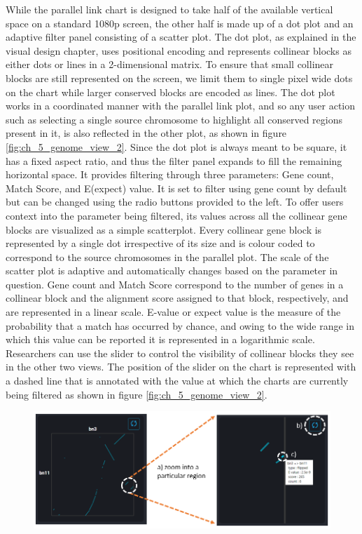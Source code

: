 While the parallel link chart is designed to take half of the available vertical space on a standard 1080p screen, the other half is made up of a dot plot and an adaptive filter panel consisting of a scatter plot. The dot plot, as explained in the visual design chapter, uses positional encoding and represents collinear blocks as either dots or lines in a 2-dimensional matrix. To ensure that small collinear blocks are still represented on the screen, we limit them to single pixel wide dots on the chart while larger conserved blocks are encoded as lines. The dot plot works in a coordinated manner with the parallel link plot, and so any user action such as selecting a single source chromosome to highlight all conserved regions present in it, is also reflected in the other plot, as shown in figure \ref{fig:ch_5_genome_view_2}. Since the dot plot is always meant to be square, it has a fixed aspect ratio, and thus the filter panel expands to fill the remaining horizontal space. It provides filtering through three parameters: Gene count, Match Score, and E(expect) value. It is set to filter using gene count by default but can be changed using the radio buttons provided to the left. To offer users context into the parameter being filtered, its values across all the collinear gene blocks are visualized as a simple scatterplot. Every collinear gene block is represented by a single dot irrespective of its size and is colour coded to correspond to the source chromosomes in the parallel plot. The scale of the scatter plot is adaptive and automatically changes based on the parameter in question. Gene count and Match Score correspond to the number of genes in a collinear block and the alignment score assigned to that block, respectively, and are represented in a linear scale. E-value or expect value is the measure of the probability that a match has occurred by chance, and owing to the wide range in which this value can be reported it is represented in a logarithmic scale. Researchers can use the slider to control the visibility of collinear blocks they see in the other two views. The position of the slider on the chart is represented with a dashed line that is annotated with the value at which the charts are currently being filtered as shown in figure \ref{fig:ch_5_genome_view_2}.


\begin{figure}[h]
  \centering
  \includegraphics[width=.95\linewidth]{images/ch_5_chromosome_view.PNG}
  \label{fig:ch_5_chromosome_view}
\end{figure} 


